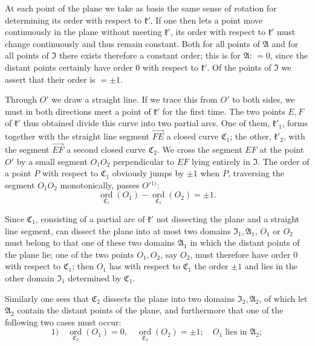 \documentclass{article}
\begin{document}
At each point of the plane we take as basis the same sense of rotation for determining its order with respect to $\mathfrak{k}'$. If one then lets a point move continuously in the plane without meeting $\mathfrak{k}'$, its order with respect to $\mathfrak{k}'$ must change continuously and thus remain constant. Both for all points of $\mathfrak{A}$ and for all points of $\mathfrak{I}$ there exists therefore a constant order; this is for $\mathfrak{A}$: $= 0$, since the distant points certainly have order $0$ with respect to $\mathfrak{k}'$. Of the points of $\mathfrak{I}$ we assert that their order is $= \pm 1$.

Through $O'$ we draw a straight line. If we trace this from $O'$ to both sides, we must in both directions meet a point of $\mathfrak{k}'$ for the first time. The two points $E, F$ of $\mathfrak{k}'$ thus obtained divide this curve into two partial arcs. One of them, $\mathfrak{k}'_1$, forms together with the straight line segment $\overrightarrow{FE}$ a closed curve $\mathfrak{C}_1$; the other, $\mathfrak{k}'_2$, with the segment $\overrightarrow{EF}$ a second closed curve $\mathfrak{C}_2$. We cross the segment $EF$ at the point $O'$ by a small segment $O_1 O_2$ perpendicular to $EF$ lying entirely in $\mathfrak{I}$. The order of a point $P$ with respect to $\mathfrak{C}_1$ obviously jumps by $\pm 1$ when $P$, traversing the segment $O_1 O_2$ monotonically, passes $O'${}${}^{1)}$:
\[ \underset{\mathfrak{C}_1}{\operatorname{ord}} (O_1) - \underset{\mathfrak{C}_1}{\operatorname{ord}} (O_2) = \pm 1. \]


Since $\mathfrak{C}_1$, consisting of a partial arc of $\mathfrak{k}'$ not dissecting the plane and a straight line segment, can dissect the plane into at most two domains $\mathfrak{I}_1, \mathfrak{A}_1$, $O_1$ or $O_2$ must belong to that one of these two domains $\mathfrak{A}_1$ in which the distant points of the plane lie; one of the two points $O_1, O_2$, say $O_2$, must therefore have order $0$ with respect to $\mathfrak{C}_1$; then $O_1$ has with respect to $\mathfrak{C}_1$ the order $\pm 1$ and lies in the other domain $\mathfrak{I}_1$ determined by $\mathfrak{C}_1$.

Similarly one sees that $\mathfrak{C}_2$ dissects the plane into two domains $\mathfrak{I}_2, \mathfrak{A}_2$, of which let $\mathfrak{A}_2$ contain the distant points of the plane, and furthermore that one of the following two cases must occur:
\[ 1) \quad \underset{\mathfrak{C}_2}{\operatorname{ord}} (O_1) = 0, \quad \underset{\mathfrak{C}_2}{\operatorname{ord}} (O_2) = \pm 1; \quad O_1 \text{ lies in } \mathfrak{A}_2; \]
\end{document}
